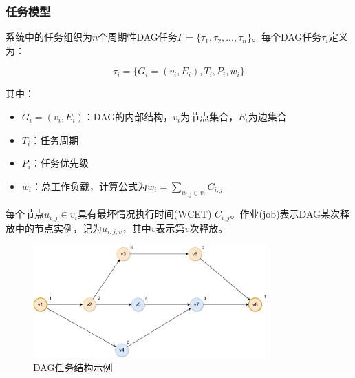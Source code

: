\subsubsection{任务模型}

系统中的任务组织为$n$个周期性DAG任务$\Gamma = \{\tau_1, \tau_2, ..., \tau_n\}$。每个DAG任务$\tau_i$定义为：

\begin{tcolorbox}[
    colback=blue!5!white,
    colframe=blue!50!black,
    arc=3pt,
    center
]
$$\tau_i = \{G_i = (v_i, E_i), T_i, P_i, w_i\}$$
\end{tcolorbox}

其中：
\begin{tcolorbox}[
    colback=cyan!5!white,
    colframe=cyan!50!black,
    arc=3pt,
    left=5pt,
    right=5pt
]
\begin{itemize}    \item \textbf{$G_i = (v_i, E_i)$}：DAG的内部结构，$v_i$为节点集合，$E_i$为边集合
    \item \textbf{$T_i$}：任务周期
    \item \textbf{$P_i$}：任务优先级
    \item \textbf{$w_i$}：总工作负载，计算公式为$w_i = \sum_{u_{i,j} \in v_i} C_{i,j}$
\end{itemize}
\end{tcolorbox}

每个节点$u_{i,j} \in v_i$具有最坏情况执行时间(WCET) $C_{i,j}$。作业(job)表示DAG某次释放中的节点实例，记为$u_{i,j,v}$，其中$v$表示第$v$次释放。\cite{r18_cache-aware_DAG_scheduling_method}

\begin{figure}[H]
\centering
\includegraphics[width=0.8\textwidth]{img/DAG.png}
\caption{DAG任务结构示例}
\label{fig:dag_example}
\end{figure}

